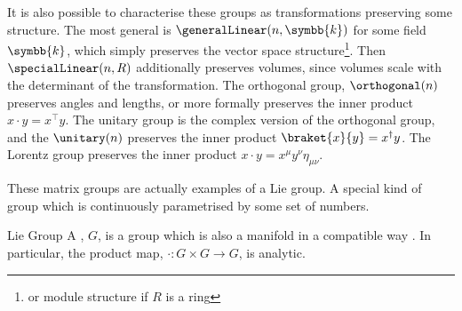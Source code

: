 \documentclass[fleqn]{NotesClass}
\renewcommand{\field}{\symbb{k}}
\newcommand{\trans}{\top}
\newcommand{\hermit}{\dagger}
\newcommand{\minkowskiMetric}{\eta}
\begin{document}
    It is also possible to characterise these groups as transformations preserving some structure.
    The most general is \(\generalLinear(n, \field)\) for some field \(\field\), which simply preserves the vector space structure\footnote{or module structure if \(R\) is a ring}.
    Then \(\specialLinear(n, R)\) additionally preserves volumes, since volumes scale with the determinant of the transformation.
    The orthogonal group, \(\orthogonal(n)\) preserves angles and lengths, or more formally preserves the inner product \(x \cdot y = x^\trans y\).
    The unitary group is the complex version of the orthogonal group, and the \(\unitary(n)\) preserves the inner product \(\braket{x}{y} = x^\hermit y\).
    The Lorentz group preserves the inner product \(x \cdot y = x^\mu y^\nu \minkowskiMetric_{\mu\nu}\).
    
    These matrix groups are actually examples of a Lie group.
    A special kind of group which is continuously parametrised by some set of numbers.
    \begin{dfn}{Lie Group}{}
        A , \(G\), is a group which is also a manifold in a compatible way \cite[87]{san-martin-lie-groups}.
        In particular, the product map, \(\cdot \colon G \times G \to G\), is analytic.
    \end{dfn}
    
\end{document}
